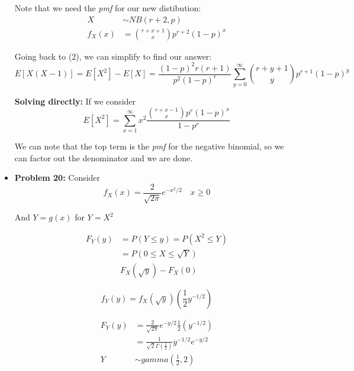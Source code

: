 \documentclass{article}
\begin{document}
\begin{itemize}
    Note that we need the \textit{pmf} for our new distibution:
    \begin{equation*}
        \begin{split}
            X &\sim NB(r+2,p)\\
            f_X(x) &= {r+x+1 \choose x} p^{r+2} (1-p)^x
        \end{split}
    \end{equation*}
    
    Going back to (2), we can simplify to find our answer:
    \begin{equation*}
        E[X(X-1)] = E[X^2] - E[X] = \frac{(1-p)^2 r(r+1)}{p^2(1-p)^r} \sum_{y=0}^\infty {r+y+1 \choose y} p^{r+1}(1-p)^y
    \end{equation*}
    
    
    \textbf{Solving directly:} If we consider
    \begin{equation*}
        E[X^2] = \sum_{x=1}^\infty x^2 \frac{{r+x-1\choose x} p^r (1-p)^x}{1-p^r}
    \end{equation*}
    
    We can note that the top term is the \textit{pmf} for the negative binomial, so we can factor out the denominator and we are done.
    
    \item \textbf{Problem 20:} Consider
    \begin{equation*}
        f_X(x) = \frac{2}{\sqrt{2\pi}} e^{-x^2/2} \quad x \geq 0
    \end{equation*}
    
    And $Y = g(x)$ for $Y = X^2$
    
    \begin{equation*}
        \begin{split}
            F_Y(y) &= P(Y \leq y) = P(X^2 \leq Y)\\
                    &= P(0\leq X \leq \sqrt{Y})\\
                    & F_X(\sqrt{y}) - F_X(0)
        \end{split}
    \end{equation*}
    
    \begin{equation*}
        f_Y(y) = f_X(\sqrt{y})\left(\frac{1}{2}y^{-1/2}\right)
    \end{equation*}
    
    \begin{equation*}
        \begin{split}
            F_Y(y) &= \frac{2}{\sqrt{2\pi}} e^{-y/2} \frac{1}{2} (y^{-1/2})\\
            &= \frac{1}{\sqrt{2}\Gamma(\frac{1}{2})} y^{-1/2}e^{-y/2}\\
            Y&\sim gamma\left(\frac{1}{2},2\right)
        \end{split}
    \end{equation*}
    

\end{itemize}
\end{document}
